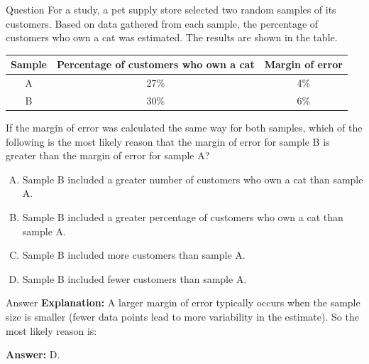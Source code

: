 \documentclass{beamer}
\begin{document}
\begin{frame}{Question}
\small
For a study, a pet supply store selected two random samples of its customers. Based on data gathered from each sample, the percentage of customers who own a cat was estimated. The results are shown in the table.

\begin{center}
\begin{tabular}{|c|c|c|}
\hline
\textbf{Sample} & \textbf{Percentage of customers who own a cat} & \textbf{Margin of error} \\
\hline
A & 27\% & 4\% \\
B & 30\% & 6\% \\
\hline
\end{tabular}
\end{center}

If the margin of error was calculated the same way for both samples, which of the following is the most likely reason that the margin of error for sample B is greater than the margin of error for sample A?

\begin{enumerate}[A.]
    \item Sample B included a greater number of customers who own a cat than sample A.
    \item Sample B included a greater percentage of customers who own a cat than sample A.
    \item Sample B included more customers than sample A.
    \item Sample B included fewer customers than sample A.
\end{enumerate}
\end{frame}


\begin{frame}{Answer}
\textbf{Explanation:}  
A larger margin of error typically occurs when the sample size is smaller (fewer data points lead to more variability in the estimate). So the most likely reason is:

\textbf{Answer:} D.
\end{frame}
\end{document}
